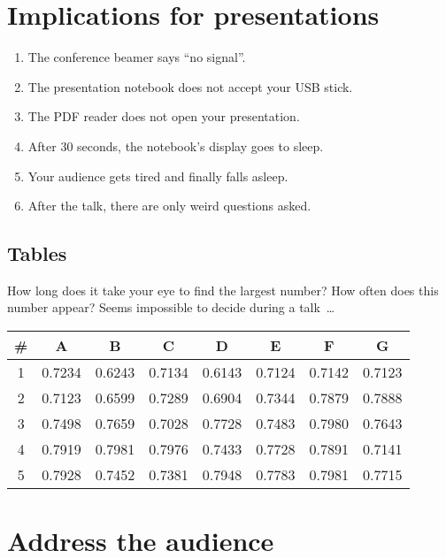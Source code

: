 \documentclass[
	paper=128mm:96mm,	%
	fontsize=11pt,					%
	pagesize,							%
	parskip=half-,					%
	numbers=noendperiod,	%
	captions=nooneline			%
	]{scrartcl}							%
\newcommand*{\mygreen}[1]{\textcolor{mygreen}{#1}}
\newcommand*{\mybrown}[1]{\textcolor{mybrown}{#1}}
\newcommand*{\myred}[1]{\textcolor{myred}{#1}}
\theoremstyle{mythmstyle}
\begin{document}
\section{Implications for presentations}
\begin{enumerate}
	\item The conference beamer says \myred{``no signal''}.
	\item The presentation notebook does \myred{not accept} your USB stick.
	\item The PDF reader does \myred{not open} your presentation. 
	\item After 30 seconds, the notebook's \mybrown{display goes to sleep}. 
	\item Your audience gets tired and finally falls \mybrown{asleep}.
	\item After the talk, there are only \mygreen{weird questions} asked.
\end{enumerate}	
\clearpage
%
%
\subsection{Tables}
How long does it take your eye to find the largest number? How often does this number appear? Seems \myred{impossible} to decide during a talk~\dots

\begin{tabularx}{\textwidth}{@{\extracolsep{\fill}}cccccccc}
   \toprule
   \multicolumn{1}{c}{\#}&\multicolumn{1}{c}{A}&\multicolumn{1}{c}{B}&\multicolumn{1}{c}{C}&\multicolumn{1}{c}{D}&\multicolumn{1}{c}{E}&\multicolumn{1}{c}{F}&\multicolumn{1}{c}{G}\\ 
   \midrule
   1&0.7234&0.6243&0.7134&0.6143&0.7124&0.7142&0.7123\\
   2&0.7123&0.6599&0.7289&0.6904&0.7344&0.7879&0.7888\\
   3&0.7498&0.7659&0.7028&0.7728&0.7483&0.7980&0.7643\\
   4&0.7919&0.7981&0.7976&0.7433&0.7728&0.7891&0.7141\\
   5&0.7928&0.7452&0.7381&0.7948&0.7783&0.7981&0.7715\\
   \bottomrule
\end{tabularx}
\clearpage
%
%
\section{Address the audience}
\begin{minipage}[c]{0.8\textwidth}
\end{minipage}
\clearpage
%
%
\end{document}
